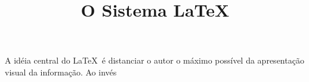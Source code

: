 \documentclass[12pt,a4paper]{article}
\title{O Sistema \LaTeX}
\begin{document}
	A idéia central do \LaTeX\ é distanciar o autor o máximo possível da apresentação visual da informação. Ao invés
\end{document}
